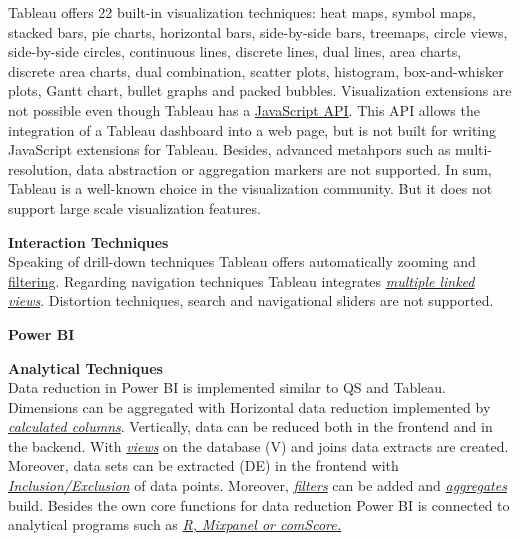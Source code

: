 Tableau offers 22 built-in visualization techniques: heat maps, symbol maps, stacked bars, pie charts, horizontal bars, side-by-side bars, treemaps, circle views, side-by-side circles, continuous lines, discrete lines, dual lines, area charts,  discrete area charts, dual combination, scatter plots, histogram, box-and-whisker plots, Gantt chart, bullet graphs and packed bubbles.
Visualization extensions are not possible even though Tableau has a \href{https://www.google.de/search?client=safari&rls=en&q=tableau+javascript+api&ie=UTF-8&oe=UTF-8&gfe_rd=cr&ei=2oLOWKveK5LZ8AeXl4bIBw}{JavaScript API}. This API allows the integration of a Tableau dashboard into a web page, but is not built for writing JavaScript extensions for Tableau. Besides, advanced metahpors such as multi-resolution, data abstraction or aggregation markers are not supported. 
In sum, Tableau is a well-known choice in the visualization community. But it does not support large scale visualization features. 
\par

\textbf{Interaction Techniques}\\
Speaking of drill-down techniques Tableau offers automatically zooming and  \hyperlink{http://kb.tableau.com/articles/howto/adding-filters-to-dashboards}{filtering}.
Regarding navigation techniques Tableau integrates \href{https://www.tableau.com/de-de/whitepapers/enhancing-visual-analysis-linking-multiple-views-data}{\textit{multiple linked views}}.
Distortion techniques, search and navigational sliders are not supported. 
\par

\noindent \textbf{Power BI}
\par
\textbf{Analytical Techniques}\\
Data reduction in Power BI is implemented similar to QS and Tableau. Dimensions can be aggregated with 
Horizontal data reduction implemented by  \href{https://powerbi.microsoft.com/en-us/documentation/powerbi-desktop-tutorial-create-calculated-columns/}{\textit{calculated columns}}. Vertically, data can be reduced both in the frontend and in the backend. With \href{https://community.powerbi.com/t5/Desktop/How-to-reduce-the-amount-of-data-that-is-loaded-into-my-Power-BI/td-p/54112}{\textit{views}} on the database  (V) and joins data extracts are created. Moreover, data sets can be extracted  (DE) in the frontend with \href{https://Power BI.microsoft.com/de-de/blog/power-bi-desktop-october-feature-summary/#grouping}{\textit{Inclusion/Exclusion}} of data points. Moreover, \href{https://powerbi.microsoft.com/en-us/documentation/powerbi-service-add-a-filter-to-a-report/}{\textit{filters}} can be added and  \href{https://powerbi.microsoft.com/en-us/documentation/powerbi-service-aggregates/}{\textit{aggregates}} build.
Besides the own core functions for data reduction Power BI is connected to analytical programs such as \href{https://Power BI.microsoft.com/de-de/blog/power-bi-desktop-october-feature-summary/#grouping}{\textit{R, Mixpanel or comScore.}}
\par

